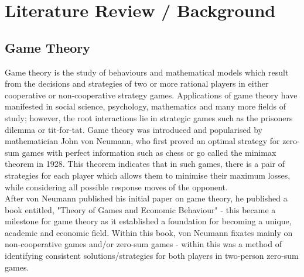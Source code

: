 \documentclass[11pt, a4paper]{article}
\title{\vspace{-7cm}}
\author{}
\date{}
\begin{document}
\maketitle

\section{Literature Review / Background}

\subsection{Game Theory}
Game theory is the study of behaviours and mathematical models which result from the decisions and strategies of two or more rational players in either cooperative or non-cooperative strategy games. Applications of game theory have manifested in social science, psychology, mathematics and many more fields of study; however, the root interactions lie in strategic games such as the prisoners dilemma or tit-for-tat. Game theory was introduced and popularised by mathematician John von Neumann, who first proved an optimal strategy for zero-sum games with perfect information such as chess or go called the minimax theorem in 1928. This theorem indicates that in such games, there is a pair of strategies for each player which allows them to minimise their maximum losses, while considering all possible response moves of the opponent. \\
\noindent
After von Neumann published his initial paper on game theory, he published a book entitled, "Theory of Games and Economic Behaviour" - this became a milestone for game theory as it established a foundation for becoming a unique, academic and economic field. Within this book, von Neumann fixates mainly on non-cooperative games and/or zero-sum games - within this was a method of identifying consistent solutions/strategies for both players in two-person zero-sum games.

\noindent

\clearpage
\end{document}
